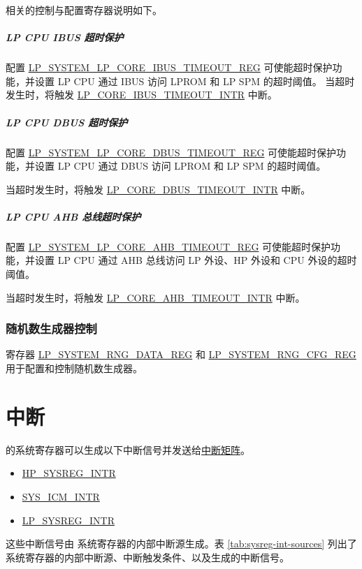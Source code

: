 \documentclass[main\_\_CN.tex]{subfiles}
\begin{document}
相关的控制与配置寄存器说明如下。


\subparagraph{LP CPU IBUS 超时保护}

配置 \hyperref[regdesc:LPSYSTEMLPCOREIBUSTIMEOUTREG]{LP\_SYSTEM\_LP\_CORE\_IBUS\_TIMEOUT\_REG} 可使能超时保护功能，并设置 LP CPU 通过 IBUS 访问 LPROM 和 LP SPM 的超时阈值。
当超时发生时，将触发 \hyperref[tab:sysreg-int-sources]{LP\_CORE\_IBUS\_TIMEOUT\_INTR} 中断。

\subparagraph{LP CPU DBUS 超时保护}

配置 \hyperref[regdesc:LPSYSTEMLPCOREDBUSTIMEOUTREG]{LP\_SYSTEM\_LP\_CORE\_DBUS\_TIMEOUT\_REG} 可使能超时保护功能，并设置 LP CPU 通过 DBUS 访问 LPROM 和 LP SPM 的超时阈值。

当超时发生时，将触发 \hyperref[tab:sysreg-int-sources]{LP\_CORE\_DBUS\_TIMEOUT\_INTR} 中断。

\subparagraph{LP CPU AHB 总线超时保护}

配置 \hyperref[regdesc:LPSYSTEMLPCOREAHBTIMEOUTREG]{LP\_SYSTEM\_LP\_CORE\_AHB\_TIMEOUT\_REG} 可使能超时保护功能，并设置 LP CPU 通过 AHB 总线访问 LP 外设、HP 外设和 CPU 外设的超时阈值。

当超时发生时，将触发 \hyperref[tab:sysreg-int-sources]{LP\_CORE\_AHB\_TIMEOUT\_INTR} 中断。


\subsubsection{随机数生成器控制}

寄存器 \hyperref[regdesc:LPSYSTEMRNGDATAREG]{LP\_SYSTEM\_RNG\_DATA\_REG} 和 \hyperref[regdesc:LPSYSTEMRNGCFGREG]{LP\_SYSTEM\_RNG\_CFG\_REG} 用于配置和控制随机数生成器。

\section{中断}

\chipname{} 的系统寄存器可以生成以下中断信号并发送给\hyperref[mod:intmtrx]{中断矩阵}。

    \begin{itemize}
        \item \hyperref[tab:sysreg-int-sources]{HP\_SYSREG\_INTR}
        \item \hyperref[tab:sysreg-int-sources]{SYS\_ICM\_INTR}
        \item \hyperref[tab:sysreg-int-sources]{LP\_SYSREG\_INTR}
    \end{itemize}

这些中断信号由 系统寄存器的内部中断源生成。表 \ref{tab:sysreg-int-sources} 列出了系统寄存器的内部中断源、中断触发条件、以及生成的中断信号。
\end{document}
